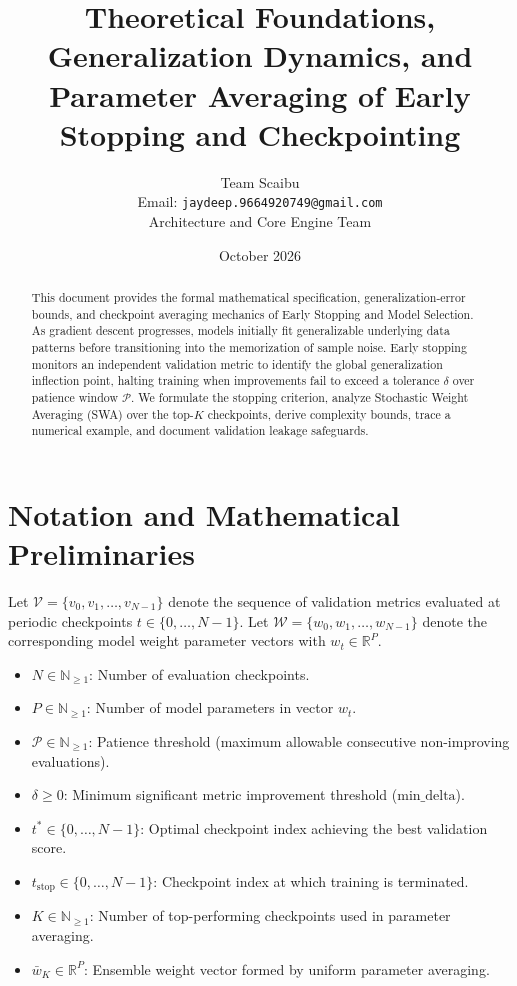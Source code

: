 \documentclass[11pt,a4paper]{article}
\title{\textbf{Theoretical Foundations, Generalization Dynamics, and Parameter Averaging of Early Stopping and Checkpointing}}
\author{Team Scaibu \\ \small Email: \texttt{jaydeep.9664920749@gmail.com} \\ \small Architecture and Core Engine Team}
\date{October 2026}
\theoremstyle{definition}
\begin{document}
\maketitle

\begin{abstract}
This document provides the formal mathematical specification, generalization-error bounds, and checkpoint averaging mechanics of Early Stopping and Model Selection. As gradient descent progresses, models initially fit generalizable underlying data patterns before transitioning into the memorization of sample noise. Early stopping monitors an independent validation metric to identify the global generalization inflection point, halting training when improvements fail to exceed a tolerance $\delta$ over patience window $\mathcal{P}$. We formulate the stopping criterion, analyze Stochastic Weight Averaging (SWA) over the top-$K$ checkpoints, derive complexity bounds, trace a numerical example, and document validation leakage safeguards.
\end{abstract}

\section{Notation and Mathematical Preliminaries}

Let $\mathcal{V} = \{v_0, v_1, \dots, v_{N-1}\}$ denote the sequence of validation metrics evaluated at periodic checkpoints $t \in \{0, \dots, N-1\}$. Let $\mathcal{W} = \{w_0, w_1, \dots, w_{N-1}\}$ denote the corresponding model weight parameter vectors with $w_t \in \mathbb{R}^P$.

\begin{itemize}
    \item $N \in \mathbb{N}_{\ge 1}$: Number of evaluation checkpoints.
    \item $P \in \mathbb{N}_{\ge 1}$: Number of model parameters in vector $w_t$.
    \item $\mathcal{P} \in \mathbb{N}_{\ge 1}$: Patience threshold (maximum allowable consecutive non-improving evaluations).
    \item $\delta \ge 0$: Minimum significant metric improvement threshold ($\text{min\_delta}$).
    \item $t^* \in \{0, \dots, N-1\}$: Optimal checkpoint index achieving the best validation score.
    \item $t_{\text{stop}} \in \{0, \dots, N-1\}$: Checkpoint index at which training is terminated.
    \item $K \in \mathbb{N}_{\ge 1}$: Number of top-performing checkpoints used in parameter averaging.
    \item $\bar{w}_K \in \mathbb{R}^P$: Ensemble weight vector formed by uniform parameter averaging.
\end{itemize}
\end{document}
